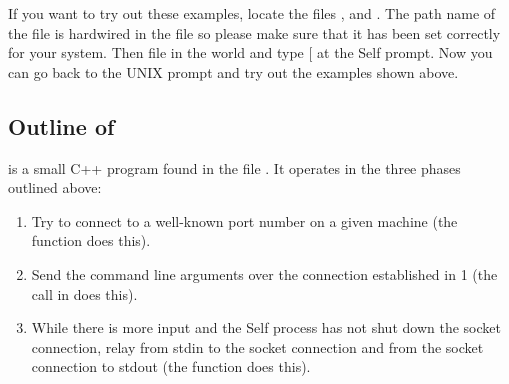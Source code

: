 \documentclass[letterpaper,10pt,english]{sphinxmanual}
\begin{document}
\begin{sphinxVerbatim}[commandchars=\\\{\}]
      

      

   
          
          
 
 

\end{sphinxVerbatim}

If you want to try out these examples, locate the files ,  and . The
path name of the file  is hardwired in the file  so please make sure that it
has been set correctly for your system. Then file in the world and type {[}\sphinxcode{server start}{]}  at
the Self prompt. Now you can go back to the UNIX prompt and try out the examples shown
above.


\subsection{Outline of }
\label{\detokenize{vmref:outline-of-toself}}
 is a small C++ program found in the file . It operates in the three phases outlined
above:
\begin{enumerate}
\item {} 
Try to connect to a well-known port number on a given machine (the function 
does this).

\item {} 
Send the command line arguments over the connection established in 1 (the 
call in  does this).

\item {} 
While there is more input and the Self process has not shut down the socket connection,
relay from stdin to the socket connection and from the socket connection to stdout (the function
 does this).

\end{enumerate}
\end{document}
